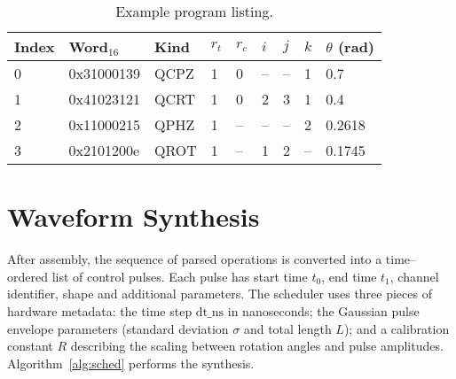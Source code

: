 \documentclass[11pt]{article}
\begin{document}
\begin{table}[H]
\centering
\caption{Example program listing.\label{tab:listing}}
\begin{tabular}{@{}llllllll@{}}
\toprule
Index & Word$_{16}$ & Kind & $r_t$ & $r_c$ & $i$ & $j$ & $k$ & $\theta$ (rad)\\
 & 0x31000139 & QCPZ & 1 & 0 & – & – & 1 & 0.7\\
1 & 0x41023121 & QCRT & 1 & 0 & 2 & 3 & 1 & 0.4\\
2 & 0x11000215 & QPHZ & 1 & – & – & – & 2 & 0.2618\\
3 & 0x2101200e & QROT & 1 & – & 1 & 2 & – & 0.1745\\
\bottomrule
\end{tabular}
\end{table}

\section{Waveform Synthesis}
After assembly, the sequence of parsed operations is converted into a
time–ordered list of control pulses.  Each pulse has start time
$t_{0}$, end time $t_{1}$, channel identifier, shape and additional
parameters.  The scheduler uses three pieces of hardware metadata: the
time step $\mathrm{dt\_ns}$ in nanoseconds; the Gaussian pulse
envelope parameters (standard deviation $\sigma$ and total length
$L$); and a calibration constant $R$ describing the scaling between
rotation angles and pulse amplitudes.  Algorithm~\ref{alg:sched}
performs the synthesis.
\end{document}

